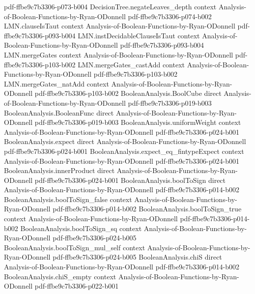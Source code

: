 \begin{theorem}
  {pdf-ffbe9c7b3306-p073-b004}
\proofstep
  {DecisionTree.negateLeaves_depth}
  {context}
  {Analysis-of-Boolean-Functions-by-Ryan-ODonnell}
  {pdf-ffbe9c7b3306-p074-b002}
\proofstep
  {LMN.clauseIsTaut}
  {context}
  {Analysis-of-Boolean-Functions-by-Ryan-ODonnell}
  {pdf-ffbe9c7b3306-p093-b004}
\proofstep
  {LMN.instDecidableClauseIsTaut}
  {context}
  {Analysis-of-Boolean-Functions-by-Ryan-ODonnell}
  {pdf-ffbe9c7b3306-p093-b004}
\proofstep
  {LMN.mergeGates}
  {context}
  {Analysis-of-Boolean-Functions-by-Ryan-ODonnell}
  {pdf-ffbe9c7b3306-p103-b002}
\proofstep
  {LMN.mergeGates_castAdd}
  {context}
  {Analysis-of-Boolean-Functions-by-Ryan-ODonnell}
  {pdf-ffbe9c7b3306-p103-b002}
\proofstep
  {LMN.mergeGates_natAdd}
  {context}
  {Analysis-of-Boolean-Functions-by-Ryan-ODonnell}
  {pdf-ffbe9c7b3306-p103-b002}
\proofstep
  {BooleanAnalysis.BoolCube}
  {direct}
  {Analysis-of-Boolean-Functions-by-Ryan-ODonnell}
  {pdf-ffbe9c7b3306-p019-b003}
\proofstep
  {BooleanAnalysis.BooleanFunc}
  {direct}
  {Analysis-of-Boolean-Functions-by-Ryan-ODonnell}
  {pdf-ffbe9c7b3306-p019-b003}
\proofstep
  {BooleanAnalysis.uniformWeight}
  {context}
  {Analysis-of-Boolean-Functions-by-Ryan-ODonnell}
  {pdf-ffbe9c7b3306-p024-b001}
\proofstep
  {BooleanAnalysis.expect}
  {direct}
  {Analysis-of-Boolean-Functions-by-Ryan-ODonnell}
  {pdf-ffbe9c7b3306-p024-b001}
\proofstep
  {BooleanAnalysis.expect_eq_fintypeExpect}
  {context}
  {Analysis-of-Boolean-Functions-by-Ryan-ODonnell}
  {pdf-ffbe9c7b3306-p024-b001}
\proofstep
  {BooleanAnalysis.innerProduct}
  {direct}
  {Analysis-of-Boolean-Functions-by-Ryan-ODonnell}
  {pdf-ffbe9c7b3306-p024-b001}
\proofstep
  {BooleanAnalysis.boolToSign}
  {direct}
  {Analysis-of-Boolean-Functions-by-Ryan-ODonnell}
  {pdf-ffbe9c7b3306-p014-b002}
\proofstep
  {BooleanAnalysis.boolToSign_false}
  {context}
  {Analysis-of-Boolean-Functions-by-Ryan-ODonnell}
  {pdf-ffbe9c7b3306-p014-b002}
\proofstep
  {BooleanAnalysis.boolToSign_true}
  {context}
  {Analysis-of-Boolean-Functions-by-Ryan-ODonnell}
  {pdf-ffbe9c7b3306-p014-b002}
\proofstep
  {BooleanAnalysis.boolToSign_sq}
  {context}
  {Analysis-of-Boolean-Functions-by-Ryan-ODonnell}
  {pdf-ffbe9c7b3306-p024-b005}
\proofstep
  {BooleanAnalysis.boolToSign_mul_self}
  {context}
  {Analysis-of-Boolean-Functions-by-Ryan-ODonnell}
  {pdf-ffbe9c7b3306-p024-b005}
\proofstep
  {BooleanAnalysis.chiS}
  {direct}
  {Analysis-of-Boolean-Functions-by-Ryan-ODonnell}
  {pdf-ffbe9c7b3306-p014-b002}
\proofstep
  {BooleanAnalysis.chiS_empty}
  {context}
  {Analysis-of-Boolean-Functions-by-Ryan-ODonnell}
  {pdf-ffbe9c7b3306-p022-b001}

\end{theorem}
